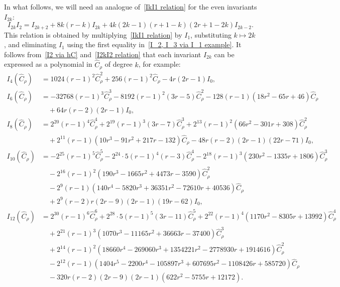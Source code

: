 \documentclass[a4paper]{article}
\newcommand{\hC}{\widehat{C}}
\renewcommand{\=}{\ =\ }
\numberwithin{equation}{section}
\theoremstyle{remark}
\begin{document}
In what follows, we will need an analogue of~\eqref{IkI1 relation} for the even invariants $I_{2k}$:
\begin{equation}\label{I2kI2 relation}
I_{2k} I_2 = I_{2k+2}
+ 8k(r-k) I_{2k}
+ 4k(2k-1)(r+1-k)(2r+1-2k) I_{2k-2}.
\end{equation}
This relation is obtained by multiplying~\eqref{IkI1 relation} by $I_1$, substituting $k \mapsto 2k$, and eliminating $I_1$ using the first equality in~\eqref{I_2, I_3 via I_1 example}. It follows from~\eqref{I2 via hC} and~\eqref{I2kI2 relation} that each invariant $I_{2k}$ can be expressed as a polynomial in $\hC_\rho$ of degree $k$, for example:
\begin{equation}\label{I4, I6 example}
\begin{aligned}
I_4(\hC_\rho) &= 1024(r-1)^2 \hC_\rho^2
+ 256(r-1)^2 \hC_\rho
- 4r(2r-1) I_0,\\
I_6(\hC_\rho) &= -32768(r-1)^3 \hC_\rho^3
- 8192(r-1)^2(3r-5)\hC_\rho^2
- 128(r-1)(18r^2-65r+46)\hC_\rho \\
&\quad + 64r(r-2)(2r-1) I_0,\\
I_8(\hC_\rho) &= 2^{20}(r-1)^4 \hC_\rho^4
+ 2^{19}(r-1)^3(3r-7)\hC_\rho^3
+ 2^{13}(r-1)^2(66r^2-301r+308)\hC_\rho^2 \\
&\quad + 2^{11}(r-1)(10r^3-91r^2+217r-132)\hC_\rho
- 48r(r-2)(2r-1)(22r-71) I_0,\\
I_{10}(\hC_\rho) &= -2^{25}(r-1)^5 \hC_\rho^5
- 2^{24}\cdot 5(r-1)^4(r-3)\hC_\rho^4
- 2^{18}(r-1)^3(230r^2-1335r+1806)\hC_\rho^3 \\
&\quad - 2^{16}(r-1)^2(190 r^3-1665 r^2+4473 r-3590)\hC_\rho^2 \\
&\quad - 2^9(r-1)(140 r^4-5820 r^3+36351 r^2-72610 r+40536)\hC_\rho \\
&\quad + 2^9(r-2) r (2 r-9)(2 r-1)(19 r-62) I_0,\\
I_{12}(\hC_\rho) &= 2^{30}(r-1)^6 \hC_\rho^6
+ 2^{28}\cdot 5(r-1)^5(3 r-11)\hC_\rho^5
+ 2^{22}(r-1)^4(1170 r^2-8305 r+13992)\hC_\rho^4 \\
&\quad + 2^{21}(r-1)^3(1070 r^3-11165 r^2+36663 r-37400)\hC_\rho^3 \\
&\quad + 2^{14}(r-1)^2(18660 r^4-269060 r^3+1354221 r^2-2778930 r+1914616)\hC_\rho^2 \\
&\quad - 2^{12}(r-1)(1404 r^5-2200 r^4-105897 r^3+607695 r^2-1108426 r+585720)\hC_\rho \\
&\quad - 320 r(r-2)(2 r-9)(2 r-1)(622 r^2-5755 r+12172).
\end{aligned}
\end{equation}
\end{document}
